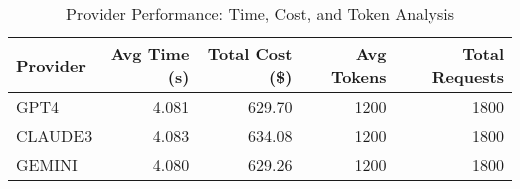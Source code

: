 \begin{table}[htbp]
\centering
\caption{Provider Performance: Time, Cost, and Token Analysis}
\label{tab:provider_performance}
\begin{tabular}{lrrrr}
\toprule
Provider & Avg Time (s) & Total Cost (\$) & Avg Tokens & Total Requests \\
\midrule
GPT4 & 4.081 & 629.70 & 1200 & 1800 \\
CLAUDE3 & 4.083 & 634.08 & 1200 & 1800 \\
GEMINI & 4.080 & 629.26 & 1200 & 1800 \\
\bottomrule
\end{tabular}
\end{table}